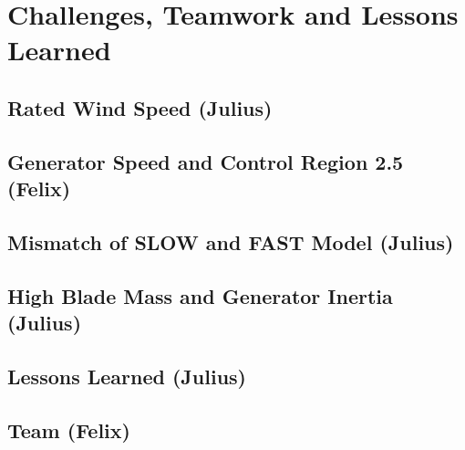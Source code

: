 \chapter{Challenges, Teamwork and Lessons Learned}
\section{Rated Wind Speed (Julius)} \label{RatedWindSpeed}


\section{Generator Speed and Control Region 2.5 (Felix)} \label{Region2d5}


\section{Mismatch of SLOW and FAST Model (Julius)}


\section[High Blade Mass and Generator Inertia (Julius)]{High Blade Mass and Generator Inertia (Julius)}


\section[Lessons Learned (Julius)]{Lessons Learned (Julius)}


\section{Team (Felix)}


